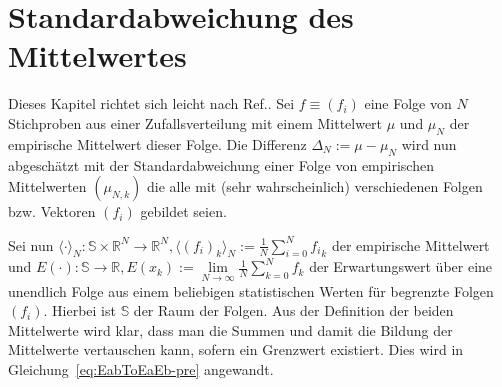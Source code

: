 \chapter{Standardabweichung des Mittelwertes}
\label{apx:meanerror}

Dieses Kapitel richtet sich leicht nach Ref.\cite{meanerrorulm}. Sei $f\equiv(f_i)$ eine Folge von $N$ Stichproben aus einer Zufallsverteilung mit einem Mittelwert $\mu$ und $\mu_N$ der empirische Mittelwert dieser Folge. Die Differenz $\Delta_N:=\mu-\mu_N$ wird nun abgeschätzt mit der Standardabweichung einer Folge von empirischen Mittelwerten $\left(\mu_{N,k}\right)$ die alle mit (sehr wahrscheinlich) verschiedenen Folgen bzw. Vektoren $(f_i)$ gebildet seien.

Sei nun $\langle \cdot \rangle_N: \mathbb{S}\times \mathbb{R}^N \rightarrow \mathbb{R}^N, \langle (f_i)_k \rangle_N:= \frac{1}{N}\sum\limits_{i=0}^N {f_i}_k$ der empirische Mittelwert und $E(\cdot):\mathbb{S}\rightarrow \mathbb{R}, E\left( x_k \right):= \lim\limits_{N\rightarrow \infty} \frac{1}{N} \sum\limits_{k=0}^N f_k$ der Erwartungswert über eine unendlich Folge aus einem beliebigen statistischen Werten für begrenzte Folgen $(f_i)$. Hierbei ist $\mathbb{S}$ der Raum der Folgen. Aus der Definition der beiden Mittelwerte wird klar, dass man die Summen und damit die Bildung der Mittelwerte vertauschen kann, sofern ein Grenzwert existiert. Dies wird in Gleichung~\ref{eq:EabToEaEb-pre} angewandt.
